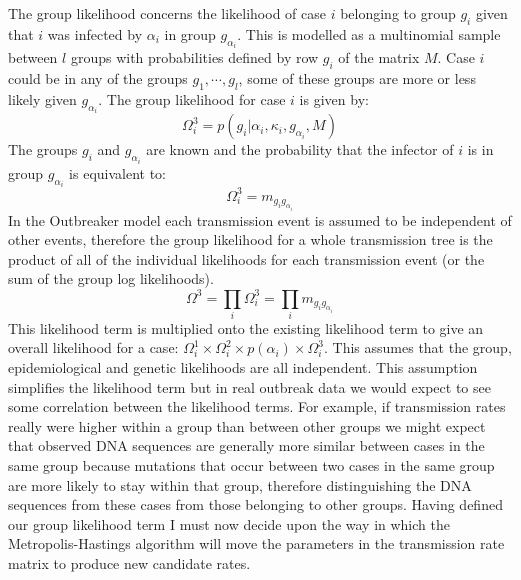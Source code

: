 \documentclass[11pt,a4paper]{report}
\begin{document}
The group likelihood concerns the likelihood of case $i$ belonging to group $g_i$ given that $i$ was infected by $\alpha_i$ in group $g_{\alpha_i}$. This is modelled as a multinomial sample between $l$ groups with probabilities defined by row $g_i$ of the matrix $M$. Case $i$ could be in any of the groups $g_1,\cdots,g_l$, some of these groups are more or less likely given $g_{\alpha_i}$. The group likelihood for case $i$ is given by:
\begin{equation}
\Omega_i^3 = p(g_i | \alpha_i, \kappa_i, g_{\alpha_i}, M)
\end{equation}
The groups $g_i$ and $g_{\alpha_i}$ are known and the probability that the infector of $i$ is in group $g_{\alpha_i}$ is equivalent to:
\begin{equation}
\Omega_i^3 = m_{g_i g_{\alpha_i}}
\end{equation}
In the Outbreaker model each transmission event is assumed to be independent of other events, therefore the group likelihood for a whole transmission tree is the product of all of the individual likelihoods for each transmission event (or the sum of the group log likelihoods).
\[ \Omega^3 = \prod_i{\Omega_i^3} = \prod_i{m_{g_i g_{\alpha_i}}} \]
This likelihood term is multiplied onto the existing likelihood term to give an overall likelihood for a case: $\Omega_i^1 \times \Omega_i^2 \times p(\alpha_i) \times \Omega_i^3$. This assumes that the group, epidemiological and genetic likelihoods are all independent. This assumption simplifies the likelihood term but in real outbreak data we would expect to see some correlation between the likelihood terms. For example, if transmission rates really were higher within a group than between other groups we might expect that observed DNA sequences are generally more similar between cases in the same group because mutations that occur between two cases in the same group are more likely to stay within that group, therefore distinguishing the DNA sequences from these cases from those belonging to other groups. Having defined our group likelihood term I must now decide upon the way in which the Metropolis-Hastings algorithm will move the parameters in the transmission rate matrix to produce new candidate rates.
\end{document}

